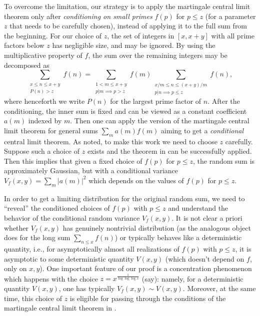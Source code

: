 \documentclass[12pt, notitlepage]{amsart}
\numberwithin{equation}{section}
\theoremstyle{remark}
\theoremstyle{definition}
\theoremstyle{remark}
\numberwithin{equation}{section}
\begin{document}
To overcome the limitation, our strategy is to apply the martingale central limit theorem only after {\em conditioning on small primes} $f(p)$ for $p\le z$ (for a parameter $z$ that needs to be carefully chosen), instead of applying it to the full sum from the beginning.   For our choice of $z$, the set of integers in $[x,x+y]$ with all prime factors below $z$ has negligible size, and may be ignored.   By using the multiplicative property of $f$, the sum over the remaining integers may be decomposed as 
\[
\sum_{\substack{x \le n \le x+y \\ P(n) > z  }  } f(n) = \sum_{ \substack{ 1<m\le x+y \\ p|m \implies p>z}} f(m) \sum_{\substack{x/m\le n \le (x+y)/m \\ p|n \implies p\le z  }  } f(n),
\] 
where henceforth we write $P(n)$ for the largest prime factor of $n$.  
After the conditioning, the inner sum is fixed and can be viewed as a constant coefficient $a(m)$ indexed by $m$. Then one can apply the version of the martingale central limit theorem \cite{SoundXu} for general sums $\sum_{m}a(m)f(m)$ aiming to get a \textit{conditional} central limit theorem. As noted, to make this work we need to choose $z$ carefully.
Suppose such a choice of $z$ exists and the theorem in \cite{SoundXu} can be successfully applied. Then this implies that given a fixed choice of $f(p)$ for $p\le z$, the random sum is approximately Gaussian, but with a conditional variance $V_f(x, y) = \sum_{m}|a(m)|^2$ which depends on the values of $f(p)$ for $p\le z$. 

In order to get a limiting distribution for the original random sum, we need to ``reveal'' the conditioned choices of $f(p)$ with $p\le z$ and 
understand the behavior of the conditional random variance $V_f(x, y)$. It is not clear a priori whether $V_f(x, y)$ has genuinely nontrivial distribution (as the analogous object does for the long sum $\sum_{n \leq x} f(n)$) or typically behaves like a deterministic quantity, i.e., for asymptotically almost all realizations of $f(p)$ with $p\le z$, it is asymptotic to some deterministic quantity $V(x, y)$ (which doesn't depend on $f$, only on $x, y$).  One important feature of our proof is a concentration phenomenon which happens with the choice $z = x^{\frac{1}{\log \log \log x}}$ (say): namely, for a deterministic quantity $V(x,y)$, one has typically $V_f(x, y)\sim V(x, y)$. Moreover,  
at the same time, this choice of $z$ is eligible for passing through the conditions of the martingale central limit theorem in \cite{SoundXu}.
\end{document}
